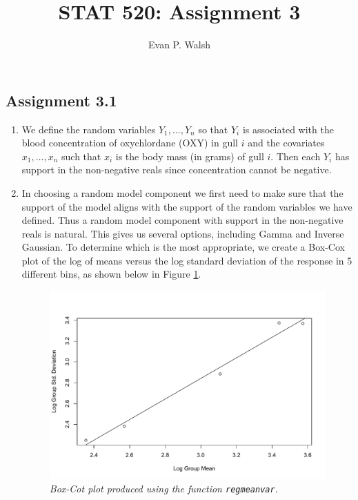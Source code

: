 \documentclass[12pt]{article}
\title{STAT 520: Assignment 3}
\author{Evan P. Walsh}
\begin{document}


\subsection*{Assignment 3.1}

\begin{enumerate}
  \item We define the random variables $Y_{1}, \dots, Y_{n}$ so that $Y_i$ is associated with the blood concentration of oxychlordane (OXY) in gull
    $i$ and the covariates $x_{1}, \dots, x_{n}$ such that $x_{i}$ is the body mass (in grams) of gull $i$. Then each $Y_{i}$ has support in the non-negative
    reals since concentration cannot be negative.

  \item In choosing a random model component we first need to make sure that the support of the model aligns with the support of the random variables we
    have defined. Thus a random model component with support in the non-negative reals is natural. This gives us several options, including Gamma and
    Inverse Gaussian. To determine which is the most appropriate, we 
    create a Box-Cox plot of the log of means 
    versus the log standard deviation of the response in 5 different bins, as shown below in Figure \ref{fig:1}.

    \begin{figure}[h]
      \centering
      \includegraphics[width=.82\textwidth]{./figures/hw03_regmeanvar.pdf}
      \caption{\emph{Box-Cot plot produced using the function \texttt{regmeanvar}.}}
      \label{fig:1}
    \end{figure}


\end{enumerate}
\end{document}

